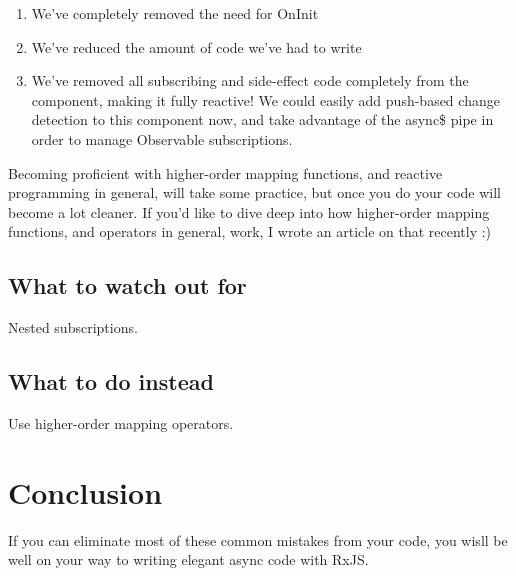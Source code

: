 \begin{enumerate}
  \item We’ve completely removed the need for OnInit
  \item We’ve reduced the amount of code we’ve had to write
  \item We’ve removed all subscribing and side-effect code completely from the component, making it fully reactive! We could easily add push-based change detection to this component now, and take advantage of the async\$ pipe in order to manage Observable subscriptions.
\end{enumerate}
 
Becoming proficient with higher-order mapping functions, and reactive programming in general, will take some practice, but once you do your code will become a lot cleaner. If you’d like to dive deep into how higher-order mapping functions, and operators in general, work, I wrote an article on that recently :)

\subsection{What to watch out for}
Nested subscriptions.

\subsection{What to do instead}
Use higher-order mapping operators.

\section{Conclusion}
If you can eliminate most of these common mistakes from your code, you wisll be well on your way to writing elegant async code with RxJS.